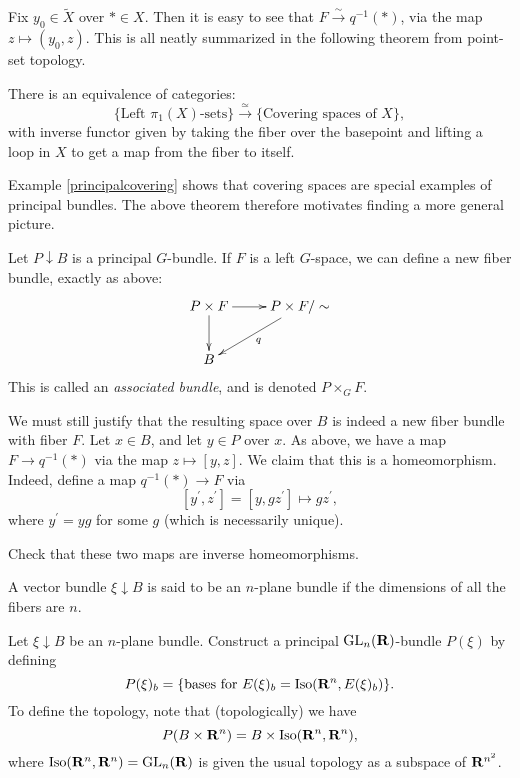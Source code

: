 Fix $y_0\in\widetilde{X}$ over $\ast\in X$. Then it is easy to see that
$F\xrightarrow{\sim}q^{-1}(\ast)$, via the map $z\mapsto (y_0,z)$. This is all
neatly summarized in the following theorem from point-set topology.
\begin{theorem}
    There is an equivalence of categories:
    $$\{\text{Left $\pi_1(X)$-sets}\}\xrightarrow{\simeq}\{\text{Covering
    spaces of }X\},$$
    with inverse functor given by taking the fiber over the basepoint and
    lifting a loop in $X$ to get a map from the fiber to itself.
\end{theorem}
Example \ref{principalcovering} shows that covering spaces are special examples
of principal bundles. The above theorem therefore motivates finding a more
general picture.
\begin{construction}
    Let $P\downarrow B$ is a principal $G$-bundle. If $F$ is a left $G$-space,
    we can define a new fiber bundle, exactly as above:
    \begin{equation*}
	\xymatrix{
	    P\times F\ar[r]\ar[d] & P\times F/\sim\ar[dl]^q\\
	    B & 
	    }
    \end{equation*}
    This is called an \emph{associated bundle}, and is denoted $P\times_G F$.
\end{construction}
We must still justify that the resulting space over $B$ is indeed a new fiber
bundle with fiber $F$. Let $x\in B$, and let $y\in P$ over $x$. As above, we
have a map $F\to q^{-1}(\ast)$ via the map $z\mapsto[y,z]$. We claim that this
is a homeomorphism. Indeed, define a map $q^{-1}(\ast)\to F$ via
$$[y^\prime,z^\prime]=[y,gz^\prime]\mapsto gz^\prime,$$
where $y^\prime = yg$ for some $g$ (which is necessarily unique).
\begin{exercise}
    Check that these two maps are inverse homeomorphisms.
\end{exercise}
\begin{definition}
    A vector bundle $\xi\downarrow B$ is said to be an $n$-plane bundle if the
    dimensions of all the fibers are $n$.
\end{definition}
Let $\xi\downarrow B$ be an $n$-plane bundle. Construct a principal
$\mathrm{GL}_n(\mathbf R)$-bundle $P(\xi)$ by defining
$$P(\xi)_b = \{\text{bases for }E(\xi)_b = \mathrm{Iso}(\mathbf R^n, E(\xi)_b)\}.$$
To define the topology, note that (topologically) we have
$$P(B\times \mathbf R^n) = B\times \mathrm{Iso}(\mathbf R^n,\mathbf R^n),$$
where $\mathrm{Iso}(\mathbf R^n,\mathbf R^n) = \mathrm{GL}_n(\mathbf R)$ is given the usual topology as a
subspace of $\mathbf R^{n^2}$.

